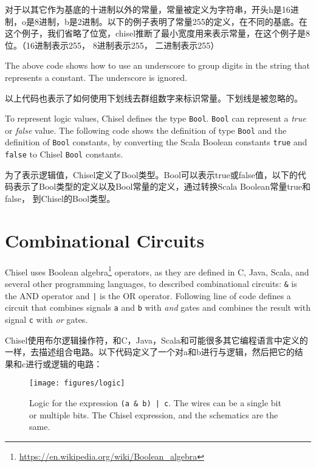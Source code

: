 \documentclass[%
    10pt,
    headinclude, footexclude,
    openright, %
    notitlepage,
    cleardoubleempty,
    headsepline,
    pointlessnumbers,
    bibtotoc, idxtotoc,
    ]{scrbook}
\newcommand{\code}[1]{{\small{\texttt{#1}}}}
\newcommand{\scale}{0.7}
\newcommand{\myref}[2]{\href{#1}{#2}}
\renewcommand{\myref}[2]{{#2}{\footnote{\url{#1}}}}
\begin{document}
对于以其它作为基底的十进制以外的常量，常量被定义为字符串，开头h是16进制，o是8进制，b是2进制。以下的例子表明了常量255的定义，在不同的基底。在这个例子，我们省略了位宽，chisel推断了最小宽度用来表示常量，在这个例子是8位。（16进制表示255， 8进制表示255， 二进制表示255）



\noindent The above code shows how to use an underscore to group digits in the
string that represents a constant. The underscore is ignored.

以上代码也表示了如何使用下划线去群组数字来标识常量。下划线是被忽略的。

To represent logic values, Chisel defines the type \code{Bool}.
\code{Bool} can represent a \emph{true} or \emph{false} value.
The following code shows the definition of type \code{Bool} and the definition of
\code{Bool} constants, by converting the Scala Boolean constants \code{true}
and \code{false} to Chisel \code{Bool} constants.

为了表示逻辑值，Chisel定义了Bool类型。Bool可以表示true或false值，以下的代码表示了Bool类型的定义以及Bool常量的定义，通过转换Scala Boolean常量true和false， 到Chisel的Bool类型。




\section{Combinational Circuits}

Chisel uses \myref{https://en.wikipedia.org/wiki/Boolean_algebra}{Boolean algebra} operators,
as they are defined in C, Java, Scala, and several other programming languages,
to described combinational circuits: \code{\&} is the AND operator and \code{|} is
the OR operator.
Following line of code defines a circuit that combines signals \code{a} and \code{b} with \emph{and}
gates and combines the result with signal \code{c} with \emph{or} gates.

Chisel使用布尔逻辑操作符，和C，Java，Scala和可能很多其它编程语言中定义的一样，去描述组合电路。以下代码定义了一个对a和b进行与逻辑，然后把它的结果和c进行或逻辑的电路：



\begin{figure}
  \centering
  \texttt{[image: figures/logic]}
  \caption{Logic for the expression \code{(a \& b) | c}.
  The wires can be a single bit or multiple bits. The Chisel expression, and the schematics are the same.}
  \label{fig:logic}
\end{figure}
\end{document}
